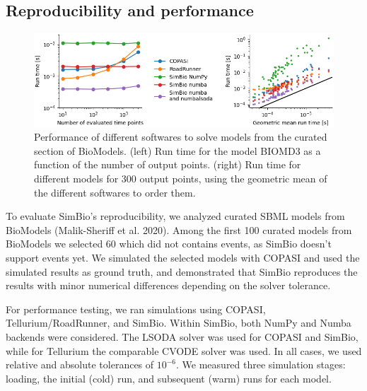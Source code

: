\documentclass[
  letterpaper,
  DIV=11,
  numbers=noendperiod]{scrartcl}
\begin{document}
\hypertarget{reproducibility-and-performance}{%
\subsection{Reproducibility and
performance}\label{reproducibility-and-performance}}

\begin{figure}

{\centering \includegraphics{src/performance/figures/performance.png}

}

\caption{\label{fig-runtime}Performance of different softwares to solve
models from the curated section of BioModels. (left) Run time for the
model BIOMD3 as a function of the number of output points. (right) Run
time for different models for 300 output points, using the geometric
mean of the different softwares to order them.}

\end{figure}

To evaluate SimBio's reproducibility, we analyzed curated SBML models
from BioModels (Malik-Sheriff et al. 2020). Among the first 100 curated
models from BioModels we selected 60 which did not contains events, as
SimBio doesn't support events yet. We simulated the selected models with
COPASI and used the simulated results as ground truth, and demonstrated
that SimBio reproduces the results with minor numerical differences
depending on the solver tolerance.

For performance testing, we ran simulations using COPASI,
Tellurium/RoadRunner, and SimBio. Within SimBio, both NumPy and Numba
backends were considered. The LSODA solver was used for COPASI and
SimBio, while for Tellurium the comparable CVODE solver was used. In all
cases, we used relative and absolute tolerances of \(10^{-6}\). We
measured three simulation stages: loading, the initial (cold) run, and
subsequent (warm) runs for each model.
\end{document}
